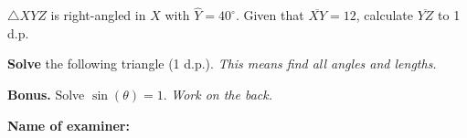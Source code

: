 \documentclass[8pt]{exam}
\begin{document}
\begin{questions}


\question[5] $\triangle XYZ$ is right-angled in $X$ with $\hat{Y} = 40^\circ$. Given that $\overline{XY} = 12$, calculate $\overline{YZ}$ to 1 d.p.
\fillwithdottedlines{70mm}

\question[5] \textbf{Solve} the following triangle (1 d.p.). \hfill \emph{This means find all angles and lengths.}
\vspace{-3mm}

\begin{minipage}{0.6\textwidth}
\fillwithdottedlines{5cm}
\end{minipage}
\hfill
\begin{minipage}{0.3\textwidth}
\end{minipage}

\vspace{-3mm}


\question[0] \textbf{Bonus.} Solve $\sin (\theta) = 1$. \hfill \emph{Work on the back.}
\end{questions}


\begin{tcolorbox}

\textbf{Name of examiner:}

\begin{center}
\gradetable[h][questions]
\end{center}

\end{tcolorbox}
\end{document}
